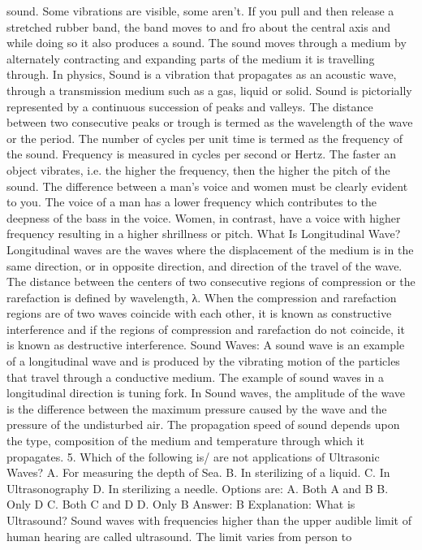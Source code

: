 sound. Some vibrations are visible, some aren’t. If you pull and then
release a stretched rubber band, the band moves to and fro about
the central axis and while doing so it also produces a sound. The
sound moves through a medium by alternately contracting and
expanding parts of the medium it is travelling through. In physics,
Sound is a vibration that propagates as an acoustic wave, through a
transmission medium such as a gas, liquid or solid.
Sound is pictorially represented by a continuous succession of peaks
and valleys. The distance between two consecutive peaks or trough is
termed as the wavelength of the wave or the period. The number of
cycles per unit time is termed as the frequency of the sound.
Frequency is measured in cycles per second or Hertz.
The faster an object vibrates, i.e. the higher the frequency, then
the higher the pitch of the sound. The difference between a man’s
voice and women must be clearly evident to you. The voice of a man
has a lower frequency which contributes to the deepness of the bass
in the voice. Women, in contrast, have a voice with higher frequency
resulting in a higher shrillness or pitch.
What Is Longitudinal Wave?
Longitudinal waves are the waves where the displacement of the
medium is in the same direction, or in opposite direction, and
direction of the travel of the wave. The distance between the
centers of two consecutive regions of compression or the
rarefaction is defined by wavelength, λ. When the compression and
rarefaction regions are of two waves coincide with each other, it is
known as constructive interference and if the regions of
compression and rarefaction do not coincide, it is known as
destructive interference.
Sound Waves: A sound wave is an example of a longitudinal wave and
is produced by the vibrating motion of the particles that travel
through a conductive medium. The example of sound waves in a
longitudinal direction is tuning fork. In Sound waves, the amplitude
of the wave is the difference between the maximum pressure
caused by the wave and the pressure of the undisturbed air.
The propagation speed of sound depends upon the type, composition
of the medium and temperature through which it propagates.
5. Which of the following is/ are not applications of Ultrasonic
Waves?
A. For measuring the depth of Sea.
B. In sterilizing of a liquid.
C. In Ultrasonography
D. In sterilizing a needle.
Options are:
A. Both A and B
B. Only D
C. Both C and D
D. Only B
Answer: B
Explanation:
What is Ultrasound?
Sound waves with frequencies higher than the upper audible limit of
human hearing are called ultrasound. The limit varies from person to
